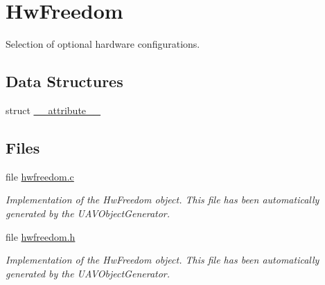 \hypertarget{group___hw_freedom}{\section{\-Hw\-Freedom}
\label{group___hw_freedom}
}


\-Selection of optional hardware configurations.  


\subsection*{\-Data \-Structures}
\begin{DoxyCompactItemize}
\item 
struct \hyperlink{struct____attribute____}{\-\_\-\-\_\-attribute\-\_\-\-\_\-}
\end{DoxyCompactItemize}
\subsection*{\-Files}
\begin{DoxyCompactItemize}
\item 
file \hyperlink{hwfreedom_8c}{hwfreedom.\-c}
\begin{DoxyCompactList}\small\item\em \-Implementation of the \-Hw\-Freedom object. \-This file has been automatically generated by the \-U\-A\-V\-Object\-Generator. \end{DoxyCompactList}\item 
file \hyperlink{hwfreedom_8h}{hwfreedom.\-h}
\begin{DoxyCompactList}\small\item\em \-Implementation of the \-Hw\-Freedom object. \-This file has been automatically generated by the \-U\-A\-V\-Object\-Generator. \end{DoxyCompactList}\end{DoxyCompactItemize}
